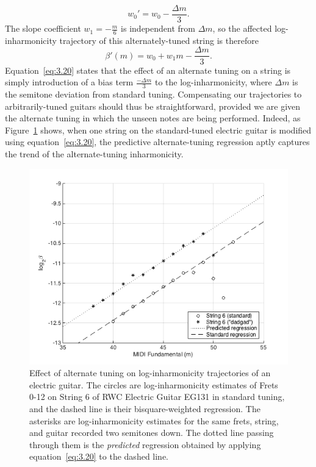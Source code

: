 \documentclass[convention,peer-reviewed]{aesconf}
\begin{document}
\begin{equation}
\label{eq:3.18}
w_{0}' = w_0 - \frac{\Delta m}{3}.
\end{equation}
The slope coefficient $w_1 = -\frac{m}{6}$ is independent from ${\Delta m}$, so the affected log-inharmonicity trajectory of this alternately-tuned string is therefore
\begin{equation}
\label{eq:3.20}
\beta'(m) = w_0 + w_1m - \frac{\Delta m}{3}.
\end{equation}
Equation~\eqref{eq:3.20} states that the effect of an alternate tuning on a string is simply introduction of a bias term $\frac{-\Delta m}{3}$ to the log-inharmonicity, where $\Delta m$ is the semitone deviation from standard tuning. Compensating our trajectories to arbitrarily-tuned guitars should thus be straightforward, provided we are given the alternate tuning in which the unseen notes are being performed. Indeed, as Figure~\ref{fig:tuning-eg} shows, when one string on the standard-tuned electric guitar is modified using equation~\eqref{eq:3.20}, the predictive alternate-tuning regression aptly captures the trend of the alternate-tuning inharmonicity.
\begin{figure}[!htbp] 
\label{fig:tuning-eg}
\centering
\includegraphics[scale=0.35]{tuning-eg}
\caption{Effect of alternate tuning on log-inharmonicity trajectories of an electric guitar. The circles are log-inharmonicity estimates of Frets 0-12 on String 6 of RWC Electric Guitar EG131 in standard tuning, and the dashed line is their bisquare-weighted regression. The asterisks are log-inharmonicity estimates for the same frets, string, and guitar recorded two semitones down. The dotted line passing through them is the \textit{predicted} regression obtained by applying equation~\eqref{eq:3.20} to the dashed line.}
\end{figure}
\end{document}
